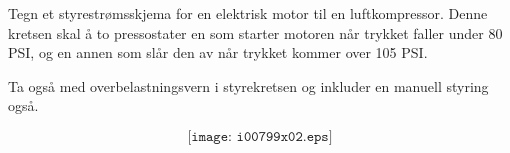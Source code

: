 

Tegn et styrestrømsskjema for en elektrisk motor til en luftkompressor. Denne kretsen skal å to pressostater en som starter motoren når trykket faller under 80 PSI, og en annen som slår den av når trykket kommer over 105 PSI. 


Ta også med overbelastningsvern i styrekretsen og inkluder en manuell styring også. 







$$\texttt{[image: i00799x02.eps]}$$











